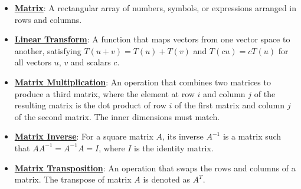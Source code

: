 \documentclass{article}%
\begin{document}
\begin{itemize}[leftmargin=*]%
\item \href{https://purdue.brightspace.com/d2l/common/assets/pdfjs-d2l-dist/1.0.14-legacy/web/viewer.html?file=\%2Fcontent\%2Fenforced\%2F1095467-wl.202510.CS.24300.001\%2F04L1-Linear Algebra Primer.pdf\%3Fou\%3D1095467\&lang=en-us\&container=d2l-fileviewer-rendered-pdf\&fullscreen=d2l-fileviewer-rendered-pdf-dialog\&height=667#page=4}{\textbf{Matrix}}: A rectangular array of numbers, symbols, or expressions arranged in rows and columns.%
\item \href{https://purdue.brightspace.com/d2l/common/assets/pdfjs-d2l-dist/1.0.14-legacy/web/viewer.html?file=\%2Fcontent\%2Fenforced\%2F1095467-wl.202510.CS.24300.001\%2F04L1-Linear Algebra Primer.pdf\%3Fou\%3D1095467\&lang=en-us\&container=d2l-fileviewer-rendered-pdf\&fullscreen=d2l-fileviewer-rendered-pdf-dialog\&height=667#page=5}{\textbf{Linear Transform}}: A function that maps vectors from one vector space to another, satisfying $T(u + v) = T(u) + T(v)$ and $T(cu) = cT(u)$ for all vectors $u$, $v$ and scalars $c$.%
\item \href{https://purdue.brightspace.com/d2l/common/assets/pdfjs-d2l-dist/1.0.14-legacy/web/viewer.html?file=\%2Fcontent\%2Fenforced\%2F1095467-wl.202510.CS.24300.001\%2F04L1-Linear Algebra Primer.pdf\%3Fou\%3D1095467\&lang=en-us\&container=d2l-fileviewer-rendered-pdf\&fullscreen=d2l-fileviewer-rendered-pdf-dialog\&height=667#page=14}{\textbf{Matrix Multiplication}}: An operation that combines two matrices to produce a third matrix, where the element at row $i$ and column $j$ of the resulting matrix is the dot product of row $i$ of the first matrix and column $j$ of the second matrix. The inner dimensions must match.%
\item \href{https://purdue.brightspace.com/d2l/common/assets/pdfjs-d2l-dist/1.0.14-legacy/web/viewer.html?file=\%2Fcontent\%2Fenforced\%2F1095467-wl.202510.CS.24300.001\%2F04L1-Linear Algebra Primer.pdf\%3Fou\%3D1095467\&lang=en-us\&container=d2l-fileviewer-rendered-pdf\&fullscreen=d2l-fileviewer-rendered-pdf-dialog\&height=667#page=10}{\textbf{Matrix Inverse}}: For a square matrix $A$, its inverse $A^{-1}$ is a matrix such that $AA^{-1} = A^{-1}A = I$, where $I$ is the identity matrix.%
\item \href{https://purdue.brightspace.com/d2l/common/assets/pdfjs-d2l-dist/1.0.14-legacy/web/viewer.html?file=\%2Fcontent\%2Fenforced\%2F1095467-wl.202510.CS.24300.001\%2F04L1-Linear Algebra Primer.pdf\%3Fou\%3D1095467\&lang=en-us\&container=d2l-fileviewer-rendered-pdf\&fullscreen=d2l-fileviewer-rendered-pdf-dialog\&height=667#page=16}{\textbf{Matrix Transposition}}: An operation that swaps the rows and columns of a matrix. The transpose of matrix $A$ is denoted as $A^T$.%

\end{itemize}
\end{document}
